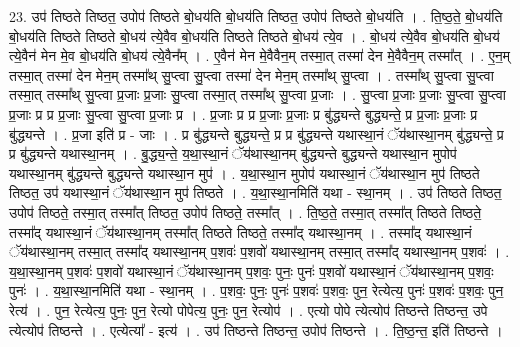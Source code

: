 \documentclass[17pt]{extarticle}
\begin{document}
23. उप॑ तिष्ठते तिष्ठत॒ उपोप॑ तिष्ठते बो॒धय॑ति बो॒धय॑ति तिष्ठत॒ उपोप॑ तिष्ठते बो॒धय॑ति । . ति॒ष्ठ॒ते॒ बो॒धय॑ति बो॒धय॑ति तिष्ठते तिष्ठते बो॒धय॑ त्ये॒वैव बो॒धय॑ति तिष्ठते तिष्ठते बो॒धय॑ त्ये॒व । . बो॒धय॑ त्ये॒वैव बो॒धय॑ति बो॒धय॑ त्ये॒वैन॑ मेन मे॒व बो॒धय॑ति बो॒धय॑ त्ये॒वैन᳚म् । . ए॒वैन॑ मेन मे॒वैवैन॒म् तस्मा॒त् तस्मा॑ देन मे॒वैवैन॒म् तस्मा᳚त् । . ए॒न॒म् तस्मा॒त् तस्मा॑ देन मेन॒म् तस्मा᳚थ् सु॒प्त्वा सु॒प्त्वा तस्मा॑ देन मेन॒म् तस्मा᳚थ् सु॒प्त्वा । . तस्मा᳚थ् सु॒प्त्वा सु॒प्त्वा तस्मा॒त् तस्मा᳚थ् सु॒प्त्वा प्र॒जाः प्र॒जाः सु॒प्त्वा तस्मा॒त् तस्मा᳚थ् सु॒प्त्वा प्र॒जाः । . सु॒प्त्वा प्र॒जाः प्र॒जाः सु॒प्त्वा सु॒प्त्वा प्र॒जाः प्र प्र प्र॒जाः सु॒प्त्वा सु॒प्त्वा प्र॒जाः प्र । . प्र॒जाः प्र प्र प्र॒जाः प्र॒जाः प्र बु॑द्ध्यन्ते बुद्ध्यन्ते॒ प्र प्र॒जाः प्र॒जाः प्र बु॑द्ध्यन्ते । . प्र॒जा इति॑ प्र - जाः । . प्र बु॑द्ध्यन्ते बुद्ध्यन्ते॒ प्र प्र बु॑द्ध्यन्ते यथास्था॒नं ॅय॑थास्था॒नम् बु॑द्ध्यन्ते॒ प्र प्र बु॑द्ध्यन्ते यथास्था॒नम् । . बु॒द्ध्य॒न्ते॒ य॒था॒स्था॒नं ॅय॑थास्था॒नम् बु॑द्ध्यन्ते बुद्ध्यन्ते यथास्था॒न मुपोप॑ यथास्था॒नम् बु॑द्ध्यन्ते बुद्ध्यन्ते यथास्था॒न मुप॑ । . य॒था॒स्था॒न मुपोप॑ यथास्था॒नं ॅय॑थास्था॒न मुप॑ तिष्ठते तिष्ठत॒ उप॑ यथास्था॒नं ॅय॑थास्था॒न मुप॑ तिष्ठते । . य॒था॒स्था॒नमिति॑ यथा - स्था॒नम् । . उप॑ तिष्ठते तिष्ठत॒ उपोप॑ तिष्ठते॒ तस्मा॒त् तस्मा᳚त् तिष्ठत॒ उपोप॑ तिष्ठते॒ तस्मा᳚त् । . ति॒ष्ठ॒ते॒ तस्मा॒त् तस्मा᳚त् तिष्ठते तिष्ठते॒ तस्मा᳚द् यथास्था॒नं ॅय॑थास्था॒नम् तस्मा᳚त् तिष्ठते तिष्ठते॒ तस्मा᳚द् यथास्था॒नम् । . तस्मा᳚द् यथास्था॒नं ॅय॑थास्था॒नम् तस्मा॒त् तस्मा᳚द् यथास्था॒नम् प॒शवः॑ प॒शवो॑ यथास्था॒नम् तस्मा॒त् तस्मा᳚द् यथास्था॒नम् प॒शवः॑ । . य॒था॒स्था॒नम् प॒शवः॑ प॒शवो॑ यथास्था॒नं ॅय॑थास्था॒नम् प॒शवः॒ पुनः॒ पुनः॑ प॒शवो॑ यथास्था॒नं ॅय॑थास्था॒नम् प॒शवः॒ पुनः॑ । . य॒था॒स्था॒नमिति॑ यथा - स्था॒नम् । . प॒शवः॒ पुनः॒ पुनः॑ प॒शवः॑ प॒शवः॒ पुन॒ रेत्येत्य॒ पुनः॑ प॒शवः॑ प॒शवः॒ पुन॒ रेत्य॑ । . पुन॒ रेत्येत्य॒ पुनः॒ पुन॒ रेत्यो पोपेत्य॒ पुनः॒ पुन॒ रेत्योप॑ । . एत्यो पोपे त्येत्योप॑ तिष्ठन्ते तिष्ठन्त॒ उपे त्येत्योप॑ तिष्ठन्ते । . एत्येत्या᳚ - इत्य॑ । . उप॑ तिष्ठन्ते तिष्ठन्त॒ उपोप॑ तिष्ठन्ते । . ति॒ष्ठ॒न्त॒ इति॑ तिष्ठन्ते । \newline
\pagebreak
{}
\end{document}
